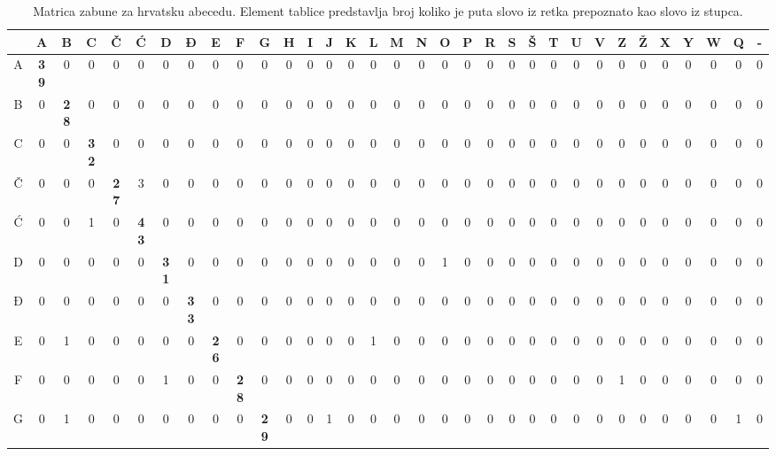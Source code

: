\begin{table}[]
\setlength{\tabcolsep}{2pt}
\centering
\caption{Matrica zabune za hrvatsku abecedu. Element tablice predstavlja broj koliko je puta slovo iz retka prepoznato kao slovo iz stupca.}
\label{confusion_matrix_cro}
\scalebox{0.8} {
\renewcommand{\arraystretch}{0.85}
\renewcommand{\tabcolsep}{0.5mm}
\begin{tabular}{|c|c|c|c|c|c|c|c|c|c|c|c|c|c|c|c|c|c|c|c|c|c|c|c|c|c|c|c|c|c|c|c|c|}
\hline  \rowcolor{gray1}
  & A & B & C & Č & Ć & D & Đ & E & F & G & H & I & J & K & L & M & N & O & P & R & S & Š & T & U & V & Z & Ž & X & Y & W & Q & -           \\ \hline 
A & \textbf{39} & 0 & 0 & 0 & 0 & 0 & 0 & 0 & 0 & 0 & 0 & 0 & 0 & 0 & 0 & 0 & 0 & 0 & 0 & 0 & 0 & 0 & 0 & 0 & 0 & 0 & 0 & 0 & 0 & 0 & 0 & 0           \\ \hline  \rowcolor{gray1}
B & 0 & \textbf{28} & 0 & 0 & 0 & 0 & 0 & 0 & 0 & 0 & 0 & 0 & 0 & 0 & 0 & 0 & 0 & 0 & 0 & 0 & 0 & 0 & 0 & 0 & 0 & 0 & 0 & 0 & 0 & 0 & 0 & 0           \\ \hline
C & 0 & 0 & \textbf{32} & 0 & 0 & 0 & 0 & 0 & 0 & 0 & 0 & 0 & 0 & 0 & 0 & 0 & 0 & 0 & 0 & 0 & 0 & 0 & 0 & 0 & 0 & 0 & 0 & 0 & 0 & 0 & 0 & 0           \\ \hline \rowcolor{gray1}
Č & 0 & 0 & 0 & \textbf{27} & 3 & 0 & 0 & 0 & 0 & 0 & 0 & 0 & 0 & 0 & 0 & 0 & 0 & 0 & 0 & 0 & 0 & 0 & 0 & 0 & 0 & 0 & 0 & 0 & 0 & 0 & 0 & 0           \\ \hline
Ć & 0 & 0 & 1 & 0 & \textbf{43} & 0 & 0 & 0 & 0 & 0 & 0 & 0 & 0 & 0 & 0 & 0 & 0 & 0 & 0 & 0 & 0 & 0 & 0 & 0 & 0 & 0 & 0 & 0 & 0 & 0 & 0 & 0           \\ \hline \rowcolor{gray1}
D & 0 & 0 & 0 & 0 & 0 & \textbf{31} & 0 & 0 & 0 & 0 & 0 & 0 & 0 & 0 & 0 & 0 & 0 & 1 & 0 & 0 & 0 & 0 & 0 & 0 & 0 & 0 & 0 & 0 & 0 & 0 & 0 & 0           \\ \hline
Đ & 0 & 0 & 0 & 0 & 0 & 0 & \textbf{33} & 0 & 0 & 0 & 0 & 0 & 0 & 0 & 0 & 0 & 0 & 0 & 0 & 0 & 0 & 0 & 0 & 0 & 0 & 0 & 0 & 0 & 0 & 0 & 0 & 0           \\ \hline \rowcolor{gray1}
E & 0 & 1 & 0 & 0 & 0 & 0 & 0 & \textbf{26} & 0 & 0 & 0 & 0 & 0 & 0 & 1 & 0 & 0 & 0 & 0 & 0 & 0 & 0 & 0 & 0 & 0 & 0 & 0 & 0 & 0 & 0 & 0 & 0           \\ \hline
F & 0 & 0 & 0 & 0 & 0 & 1 & 0 & 0 & \textbf{28} & 0 & 0 & 0 & 0 & 0 & 0 & 0 & 0 & 0 & 0 & 0 & 0 & 0 & 0 & 0 & 0 & 1 & 0 & 0 & 0 & 0 & 0 & 0           \\ \hline \rowcolor{gray1}
G & 0 & 1 & 0 & 0 & 0 & 0 & 0 & 0 & 0 & \textbf{29} & 0 & 0 & 1 & 0 & 0 & 0 & 0 & 0 & 0 & 0 & 0 & 0 & 0 & 0 & 0 & 0 & 0 & 0 & 0 & 0 & 1 & 0           \\ \hline

\end{tabular}}
\end{table}

